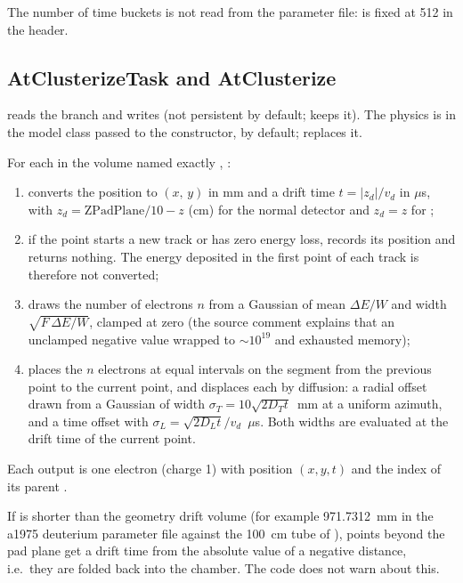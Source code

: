 The number of time buckets is not read from the parameter file:  is fixed
at 512 in the header.

\subsection{AtClusterizeTask and AtClusterize}

 reads the branch  and writes  (not
persistent by default;  keeps it). The physics is in the model class
passed to the constructor,  by default;  replaces it.

For each  in the volume named exactly , :

\begin{enumerate}
  \item converts the position to $(x,\,y)$ in mm and a drift time
    $t = |z_d|/v_d$ in $\mu$s, with $z_d = \mathrm{ZPadPlane}/10 - z$ (cm) for the normal
    detector and $z_d = z$ for ;
  \item if the point starts a new track or has zero energy loss, records its position and returns
    nothing. The energy deposited in the first point of each track is therefore not converted;
  \item draws the number of electrons $n$ from a Gaussian of mean $\Delta E/W$ and width
    $\sqrt{F\,\Delta E/W}$, clamped at zero (the source comment explains that an unclamped negative
    value wrapped to $\sim10^{19}$ and exhausted memory);
  \item places the $n$ electrons at equal intervals on the segment from the previous point to the
    current point, and displaces each by diffusion: a radial offset drawn from a Gaussian of width
    $\sigma_T = 10\sqrt{2 D_T t}$~mm at a uniform azimuth, and a time offset with
    $\sigma_L = \sqrt{2 D_L t}/v_d$~$\mu$s. Both widths are evaluated at the drift time of the
    current point.
\end{enumerate}

Each output  is one electron (charge 1) with position $(x, y, t)$ and the
index of its parent .

If  is shorter than the geometry drift volume (for example 971.7312~mm in the
a1975 deuterium parameter file against the 100~cm tube of ), points beyond
the pad plane get a drift time from the absolute value of a negative distance, i.e.\ they are folded
back into the chamber. The code does not warn about this.

